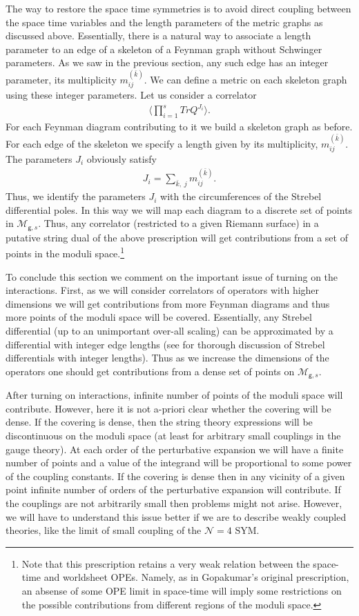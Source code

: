 \documentclass[11pt]{JHEP3}
\def\be{\begin{eqnarray}}
\def\ee{\end{eqnarray}}
\def\gg{\mathsf g }
\begin{document}
The way to restore the space time symmetries is to avoid direct coupling between the 
space time variables and the length parameters of the metric graphs as discussed 
above. Essentially, there is a natural 
way to associate a length parameter to an edge of a skeleton of a Feynman graph without
Schwinger parameters. As we saw in the previous section, any such edge has an integer parameter, its multiplicity $m_{ij}^{(\bar k)}$. We can define a metric on each skeleton
graph using these integer parameters. 
 Let us  consider a correlator
\be\langle\prod_{i=1}^s Tr Q^{J_i}\rangle.\ee
 For each Feynman diagram contributing to it we build a  skeleton graph as before. For each 
edge of the skeleton we specify a length given by its multiplicity, $m_{ij}^{(\bar k)}$. The 
parameters $J_i$ obviously satisfy
\be
J_i=\sum_{\bar k,\; j} m_{ij}^{(\bar k)}.
\ee Thus, we identify the parameters $J_i$ with the circumferences of the Strebel differential
poles.
 In this way we will map each diagram  to a discrete set of points in ${\mathcal M}_{\gg,s}$. Thus, any correlator 
(restricted to a given Riemann surface) in a putative string dual of the above prescription  will get contributions from a set of points in the moduli space.\footnote{Note that this prescription
retains a very weak relation between the space-time and worldsheet OPEs. Namely, as in Gopakumar's
original prescription, an absense of some OPE limit  in space-time will imply some
restrictions on the possible contributions from different regions of the moduli space.}

\medskip
To conclude this section we comment on the important issue of turning on the interactions.
First, as we will consider correlators of operators with higher dimensions we will get contributions from
more Feynman diagrams and thus more points of the moduli space will be covered.  Essentially, any Strebel differential (up to an
unimportant over-all scaling) can be approximated by a differential with integer edge lengths
(see \cite{Cach} for thorough discussion of Strebel differentials
with integer lengths). Thus as we increase the dimensions of the operators one
should get contributions from a dense set of points on ${\mathcal M}_{\gg,s}$.

After  turning on interactions,  infinite number of points of the moduli space will contribute. However,
here it is not a-priori clear whether the covering will be dense. If the covering is dense, then the string theory
expressions will be discontinuous on the moduli space (at least for arbitrary small couplings in the gauge theory). At each order of the perturbative expansion
we will  have a finite number of points and a value of the integrand will be proportional to some power of
the coupling constants. If the covering is dense then in any vicinity of a given point infinite number of orders of the
perturbative expansion will contribute.  If the couplings are not arbitrarily small
then problems might not arise. However, we will have to understand this issue better
if we are to describe weakly coupled theories, like the limit of small coupling of
the ${\mathcal N}=4$ SYM.
 
\end{document}
